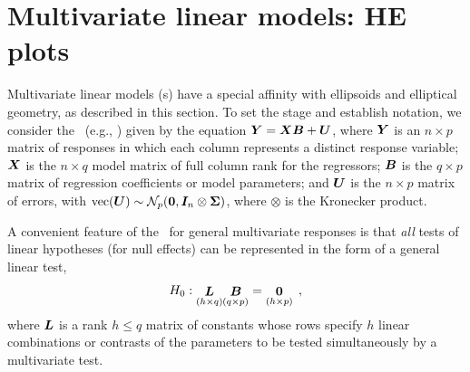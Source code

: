 
\section{Multivariate linear models: HE plots}\label{sec:mlm}


Multivariate linear models (\MLM{}s) have a special affinity with ellipsoids and elliptical geometry,
as described in this section.  To set the stage and establish notation, we consider
the \MLM\ (e.g., \citet{Timm:75}) given by
the equation $\bm{Y}=\bm{XB}+\bm{U}$, where $\bm{Y}$ is an $%
n\times p$ matrix of responses in which each column represents a distinct
response variable; $\bm{X}$ is the  $n\times q$ model matrix of full
column rank for the regressors; $\bm{B}$ is the $q \times p$ matrix
of regression coefficients or model parameters; and $\bm{U}$ is the $n \times p$
matrix of errors,
with $\textrm{vec}(\bm{U}) \sim \mathcal{N}_p ( \bm{0}, \bm{I}_n \otimes \bm{\Sigma} )$,
where $\otimes$ is the Kronecker product.

A convenient feature of the \MLM\ for general multivariate responses is that
\emph{all} tests of linear hypotheses (for null effects) can be represented in the form of a general
linear test,
\begin{equation}\label{eq:mglt}
H_0 : \mathord{\mathop{\bm{L}}\limits_{(h \times q)}}
\mathord{\mathop{\bm{B}}\limits_{(q \times p)}} =
\mathord{\mathop{\bm{0}}\limits_{(h \times p)}}
\:\: ,
\end{equation}
where $\bm{L}$ is a rank $h \leq q$ matrix of constants whose rows specify
$h$ linear combinations or contrasts
of the parameters to be tested simultaneously
by a multivariate test.

